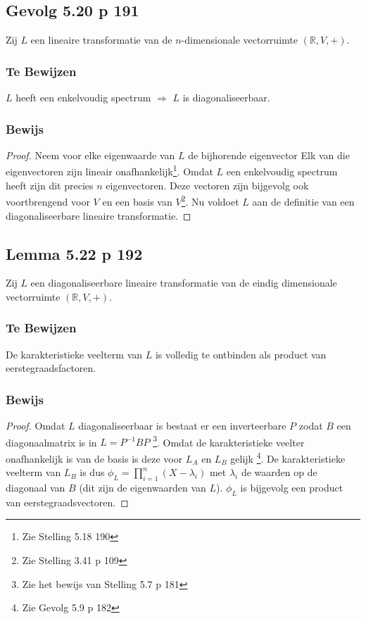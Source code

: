 \documentclass[lineaire_algebra_oplossingen.tex]{subfiles}
\begin{document}
\subsection{Gevolg 5.20 p 191}
\label{5.20}
Zij $L$ een lineaire transformatie van de $n$-dimensionale vectorruimte $(\mathbb{R},V,+)$.

\subsubsection*{Te Bewijzen}
\begin{center}
$L$ heeft een enkelvoudig spectrum $\Rightarrow$ $L$ is diagonaliseerbaar.
\end{center}

\subsubsection*{Bewijs}
\begin{proof}
Neem voor elke eigenwaarde van $L$ de bijhorende eigenvector
Elk van die eigenvectoren zijn lineair onafhankelijk\footnote{Zie Stelling 5.18 190}.
Omdat $L$ een enkelvoudig spectrum heeft zijn dit precies $n$ eigenvectoren.
Deze vectoren zijn bijgevolg ook voortbrengend voor $V$ en een basis van $V$\footnote{Zie Stelling 3.41 p 109}.
Nu voldoet $L$ aan de definitie van een diagonaliseerbare lineaire transformatie.
\end{proof}


\subsection{Lemma 5.22 p 192}
\label{5.22}
Zij $L$ een diagonaliseerbare lineaire transformatie van de eindig dimensionale vectorruimte $(\mathbb{R},V,+)$.

\subsubsection*{Te Bewijzen}
De karakteristieke veelterm van $L$ is volledig te ontbinden als product van eerstegraadsfactoren.

\subsubsection*{Bewijs}
\begin{proof}
Omdat $L$ diagonaliseerbaar is bestaat er een inverteerbare $P$ zodat $B$ een diagonaalmatrix is in $L = P^{-1}BP$ \footnote{Zie het bewijs van Stelling 5.7 p 181}. Omdat de karakteristieke veelter onafhankelijk is van de basis is deze voor $L_A$ en $L_B$ gelijk \footnote{Zie Gevolg 5.9 p 182}. De karakteristieke veelterm van $L_B$ is dus $\phi_L = \prod_{i=1}^n(X-\lambda_i)$ met $\lambda_i$ de waarden op de diagonaal van $B$ (dit zijn de eigenwaarden van $L$).  $\phi_L$ is bijgevolg een product van eerstegraadsvectoren.
\end{proof}
\end{document}
